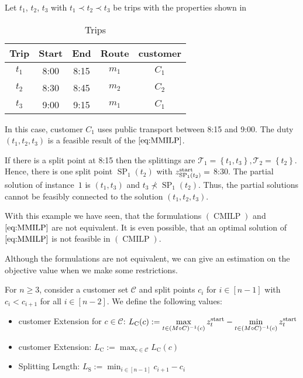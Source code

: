 \begin{example}

Let $t_1$, $t_2$, $t_3$ with $t_1\prec t_2\prec t_3$ be trips with the properties shown in 

\begin{table}[htb]
	\centering
	\begin{tabular}{c|cccc}
		Trip & Start & End & Route & customer \\
		\hline
		$t_1$ & 8:00 & 8:15 & $m_1$ & $C_1$ \\
		$t_2$ & 8:30 & 8:45 & $m_2$ & $C_2$ \\
		$t_3$ & 9:00 & 9:15 & $m_1$ & $C_1$ \\
	\end{tabular}
	\caption{Trips}
	\label{tab:customer_heuristic_example}
\end{table}

In this case, customer $C_1$ uses public transport between 8:15 and 9:00. The duty $\left(t_1,t_2,t_3\right)$ is a feasible result of the $\eqref{eq:MMILP}$.

If there is a split point at 8:15 then the splittings are $\mathcal{T}_1=\left\{t_1,t_3\right\},\mathcal{T}_2=\left\{t_2\right\}$. Hence, there is one split point $\operatorname{SP}_1\left(t_2\right)$ with $z^{\operatorname{start}}_{\operatorname{SP}_1\left(t_2\right)} =$ 8:30. The partial solution of instance~$1$ is $\left(t_1,t_3\right)$ and $t_3\not\prec \operatorname{SP}_1\left(t_2\right)$. Thus, the partial solutions cannot be feasibly connected to the solution $\left(t_1,t_2,t_3\right)$.

\end{example}

With this example we have seen, that the formulations $(\operatorname{CMILP})$ and $\eqref{eq:MMILP}$ are not equivalent. It is even possible, that an optimal solution of $\eqref{eq:MMILP}$ is not feasible in $(\operatorname{CMILP})$.

Although the formulations are not equivalent, we can give an estimation on the objective value when we make some restrictions.

\begin{definition}

For $n\geq 3$, consider a customer set $\mathcal{C}$ and split points $c_i$ for $i\in[n-1]$ with $c_i<c_{i+1}$ for all $i\in[n-2]$. We define the following values:
\begin{itemize}
	\item{customer Extension for $c\in\mathcal{C}$: $\displaystyle{L_{\operatorname{C}}(c) := \max_{t\in(M\circ C)^{-1}(c)}z^{\operatorname{start}}_t - \min_{t\in(M\circ C)^{-1}(c)}z^{\operatorname{start}}_t}$}
	\item{customer Extension: $\displaystyle{L_{\operatorname{C}} := \max_{c\in\mathcal{C}} L_{\operatorname{C}}(c)}$}
	\item{Splitting Length: $\displaystyle{L_{\operatorname{S}} := \min_{i\in[n-1]} c_{i+1}-c_i}$}
\end{itemize}

\end{definition}

